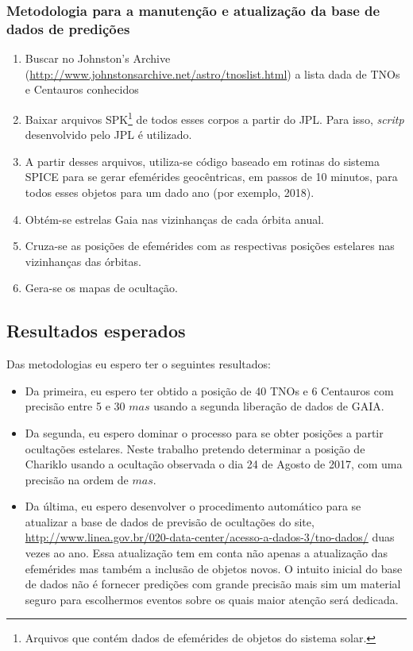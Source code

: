\documentclass[a4paper, 11pt]{article}
\begin{document}
\subsubsection{Metodologia para a manuten\c c\~ao e atualiza\c c\~ao da base de dados de predi\c c\~oes}
\begin{enumerate}
  \item Buscar no Johnston's Archive (\url{http://www.johnstonsarchive.net/astro/tnoslist.html}) a lista dada de TNOs e Centauros conhecidos
  \item Baixar arquivos SPK\footnote{Arquivos que cont\'em dados de efem\'erides de objetos do sistema solar.} de todos esses corpos a partir do JPL. Para isso, \textit{scritp} desenvolvido pelo JPL \'e utilizado.
  \item A partir desses arquivos, utiliza-se c\'odigo baseado em rotinas do sistema SPICE para se gerar efem\'erides geoc\^entricas, em passos de 10 minutos, para todos esses objetos para um dado ano (por exemplo, 2018).
  \item Obt\'em-se estrelas Gaia nas vizinhan\c cas de cada \'orbita anual.
  \item Cruza-se as posi\c c\~oes de efem\'erides com as respectivas posi\c c\~oes estelares nas vizinhan\c cas das \'orbitas.
  \item Gera-se os mapas de oculta\c c\~ao.
\end{enumerate}

\subsection{Resultados esperados}

Das metodologias eu espero ter o seguintes resultados:
\begin{itemize}
  \item Da primeira, eu espero ter obtido a posição de 40 TNOs e 6 Centauros com precisão entre 5 e 30 $mas$ usando a segunda liberação de dados de GAIA.
  \item Da segunda, eu espero dominar o processo para se obter posições a partir ocultações estelares. Neste trabalho pretendo determinar a posição de Chariklo usando a ocultação observada o dia 24 de Agosto de 2017, com uma precisão na ordem de $mas$. 
  \item Da última, eu espero desenvolver o procedimento automático para se atualizar a base de dados de previsão de ocultações do site,  \url{http://www.linea.gov.br/020-data-center/acesso-a-dados-3/tno-dados/} duas
  vezes ao ano. Essa atualização tem em conta não apenas a atualização das efemérides mas também a inclusão de objetos novos. O intuito inicial do base de dados não é fornecer predições com grande precisão mais sim um material seguro para escolhermos eventos sobre os quais maior atenção será dedicada.
\end{itemize}
\end{document}
